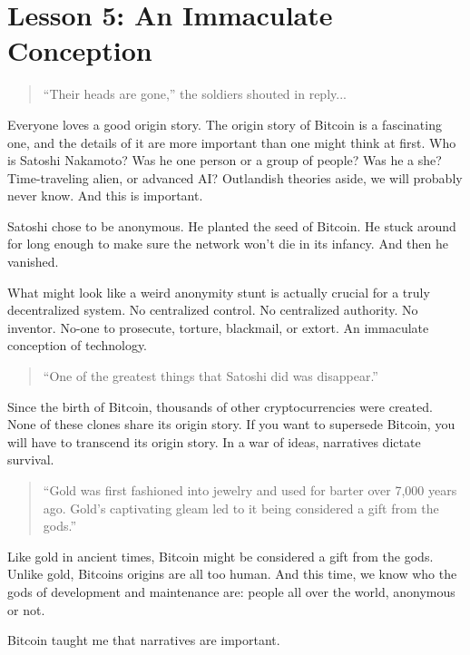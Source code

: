 \chapter{Lesson 5: An Immaculate Conception}
\label{les:5}

\blockquote{
``Their heads are gone,'' the soldiers shouted in reply...
}

Everyone loves a good origin story. The origin story of Bitcoin is a
fascinating one, and the details of it are more important than one might
think at first. Who is Satoshi Nakamoto? Was he one person or a group of
people? Was he a she? Time-traveling alien, or advanced AI? Outlandish
theories aside, we will probably never know. And this is important.

Satoshi chose to be anonymous. He planted the seed of Bitcoin. He stuck
around for long enough to make sure the network won't die in its
infancy. And then he vanished.

What might look like a weird anonymity stunt is actually crucial for a
truly decentralized system. No centralized control. No centralized
authority. No inventor. No-one to prosecute, torture, blackmail, or
extort. An immaculate conception of technology.

\begin{quotation}
``One of the greatest things that Satoshi did was disappear.''
\end{quotation}

Since the birth of Bitcoin, thousands of other cryptocurrencies were
created. None of these clones share its origin story. If you want to
supersede Bitcoin, you will have to transcend its origin story. In a war
of ideas, narratives dictate survival.

\begin{quotation}
``Gold was first fashioned into jewelry and used for barter over 7,000
years ago. Gold's captivating gleam led to it being considered a gift
from the gods.''
\end{quotation}

Like gold in ancient times, Bitcoin might be considered a gift from the
gods. Unlike gold, Bitcoins origins are all too human. And this time, we
know who the gods of development and maintenance are: people all over
the world, anonymous or not.

Bitcoin taught me that narratives are important.

%
%
%
%
